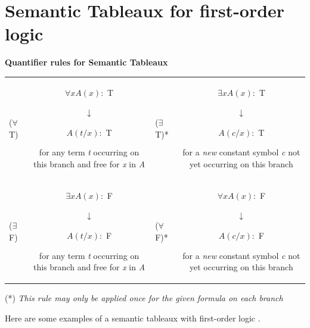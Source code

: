 \documentclass[10pt,a4paper]{article}
\begin{document}
\section{Semantic Tableaux for first-order logic}

\begin{center}
\textbf{Quantifier rules for Semantic Tableaux}
\end{center}
\begin{tabular}{l c l c}
($ \forall $ T) &  \parbox{5cm}{\centering$ \forall x A(x) : $ T
\newline
$ \downarrow $
\newline
$ A(t/x) : $ T
\newline
for any term \textit{t} occurring on this branch and free for \textit{x} in \textit{A}} & ($ \exists $ T)* & \parbox{5cm}{\centering$ \exists x A(x) : $ T
\newline
$ \downarrow $
\newline
$ A(c/x) : $ T
\newline
for a \textit{new} constant symbol \textit{c} not yet occurring on this branch}  \\[1.5cm]

($ \exists $ F) & \parbox{5cm}{\centering$ \exists x A(x) : $ F
\newline
$ \downarrow $
\newline
$ A(t/x) : $ F
\newline
for any term \textit{t} occurring on this branch and free for \textit{x} in \textit{A}} & ($ \forall $ F)*  & \parbox{5cm}{\centering$ \forall x A(x) : $ F
\newline
$ \downarrow $
\newline
$ A(c/x) : $ F
\newline
for a \textit{new} constant symbol \textit{c} not yet occurring on this branch}  \\
\end{tabular}

(*) \textit{This rule may only be applied once for the given formula on each branch}

Here are some examples of a semantic tableaux with first-order logic \cite[p. 46]{LecPartII}.
\end{document}

